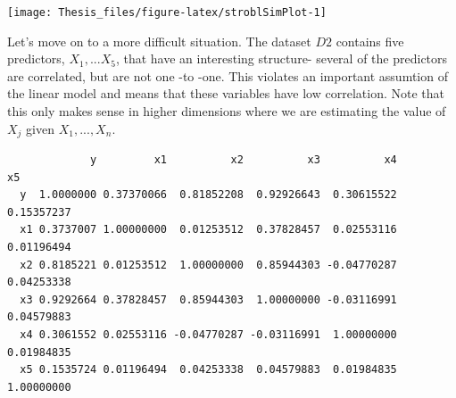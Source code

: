 \documentclass[12pt,twoside]{reedthesis}
\begin{document}
  \begin{center}\texttt{[image: Thesis\_files/figure-latex/stroblSimPlot-1]} \end{center}
  
  Let's move on to a more difficult situation. The dataset \(D2\) contains
  five predictors, \(X_1,...X_5\), that have an interesting structure-
  several of the predictors are correlated, but are not one -to -one. This
  violates an important assumtion of the linear model and means that these
  variables have low correlation. Note that this only makes sense in
  higher dimensions where we are estimating the value of \(X_j\) given
  \(X_1,...,X_n\).
  
  \begin{Shaded}
  \begin{Highlighting}[]
  \StringTok{ }\NormalTok{(}\NormalTok{)}
  
  \StringTok{ }\NormalTok{*}\NormalTok{(}\StringTok{ }\NormalTok{(}\NormalTok{)}
  
  \StringTok{ }\StringTok{ }\StringTok{ }\NormalTok{(}\NormalTok{)}
  
  \StringTok{ }\NormalTok{(}\NormalTok{)}
  
  \StringTok{ }\NormalTok{*}\NormalTok{(}\StringTok{ }\NormalTok{(}\NormalTok{)}
  
  \StringTok{ }\StringTok{ }\StringTok{ } \NormalTok{*}\StringTok{ }\StringTok{ }\StringTok{ }\StringTok{ }\NormalTok{(}\NormalTok{)}
  
  \StringTok{ }
  
  \end{Highlighting}
  \end{Shaded}
  
  \begin{verbatim}
             y         x1          x2          x3          x4         x5
  y  1.0000000 0.37370066  0.81852208  0.92926643  0.30615522 0.15357237
  x1 0.3737007 1.00000000  0.01253512  0.37828457  0.02553116 0.01196494
  x2 0.8185221 0.01253512  1.00000000  0.85944303 -0.04770287 0.04253338
  x3 0.9292664 0.37828457  0.85944303  1.00000000 -0.03116991 0.04579883
  x4 0.3061552 0.02553116 -0.04770287 -0.03116991  1.00000000 0.01984835
  x5 0.1535724 0.01196494  0.04253338  0.04579883  0.01984835 1.00000000
  \end{verbatim}
  
\end{document}

